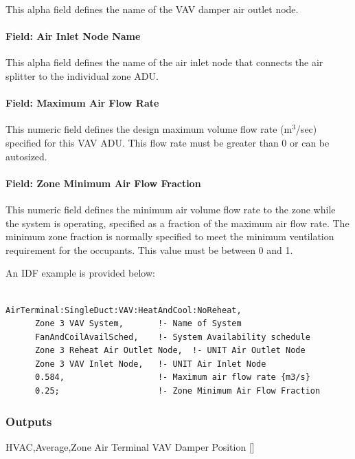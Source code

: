 This alpha field defines the name of the VAV damper air outlet node.

\paragraph{Field: Air Inlet Node Name}\label{field-air-inlet-node-name-5}

This alpha field defines the name of the air inlet node that connects the air splitter to the individual zone ADU.

\paragraph{Field: Maximum Air Flow Rate}\label{field-maximum-air-flow-rate-5}

This numeric field defines the design maximum volume flow rate (m\(^{3}\)/sec) specified for this VAV ADU. This flow rate must be greater than 0 or can be autosized.

\paragraph{Field: Zone Minimum Air Flow Fraction}\label{field-zone-minimum-air-flow-fraction-2}

This numeric field defines the minimum air volume flow rate to the zone while the system is operating, specified as a fraction of the maximum air flow rate. The minimum zone fraction is normally specified to meet the minimum ventilation requirement for the occupants. This value must be between 0 and 1.

An IDF example is provided below:

\begin{lstlisting}

AirTerminal:SingleDuct:VAV:HeatAndCool:NoReheat,
      Zone 3 VAV System,       !- Name of System
      FanAndCoilAvailSched,    !- System Availability schedule
      Zone 3 Reheat Air Outlet Node,  !- UNIT Air Outlet Node
      Zone 3 VAV Inlet Node,   !- UNIT Air Inlet Node
      0.584,                   !- Maximum air flow rate {m3/s}
      0.25;                    !- Zone Minimum Air Flow Fraction
\end{lstlisting}

\subsubsection{Outputs}\label{outputs-6}

HVAC,Average,Zone Air Terminal VAV Damper Position {[]}

